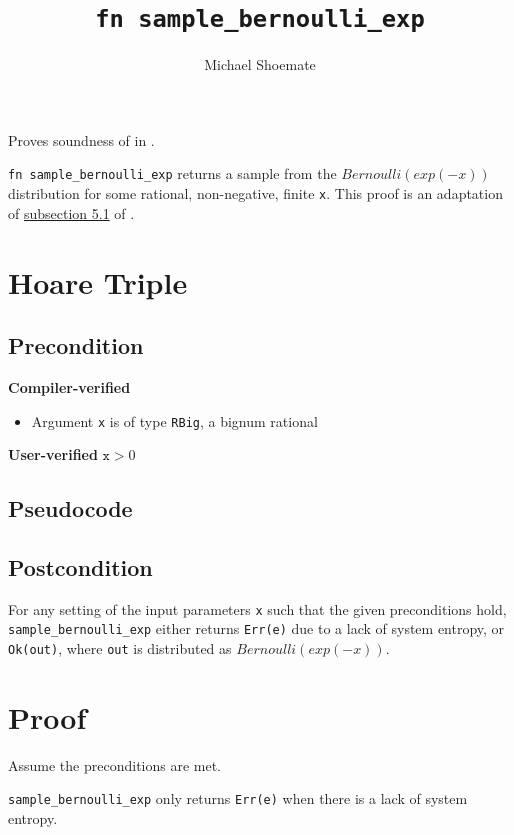 \documentclass{article}
\title{\texttt{fn sample\_bernoulli\_exp}}
\author{Michael Shoemate}
\begin{document}
 
\maketitle 
 
Proves soundness of  in . 
 
\texttt{fn sample\_bernoulli\_exp} returns a sample from the $Bernoulli(exp(-x))$ distribution for some rational, non-negative, finite \texttt{x}. 
This proof is an adaptation of \href{https://arxiv.org/pdf/2004.00010.pdf#subsection.5.1}{subsection 5.1} of \cite{CKS20}. 
 
\section{Hoare Triple} 
\subsection*{Precondition} 
\textbf{Compiler-verified} 
\begin{itemize} 
    \item Argument \texttt{x} is of type \texttt{RBig}, a bignum rational 
\end{itemize} 
 
\textbf{User-verified} 
$\texttt{x} > 0$ 
 
\subsection*{Pseudocode}         
 
 
\subsection*{Postcondition} 
\label{postcondition} 
For any setting of the input parameters \texttt{x} such that the given preconditions hold, \\ 
\texttt{sample\_bernoulli\_exp} either returns \texttt{Err(e)} due to a lack of system entropy, 
or \texttt{Ok(out)}, where \texttt{out} is distributed as $Bernoulli(exp(-x))$. 
 
\section{Proof} 
Assume the preconditions are met. 
 
\begin{lemma} 
    \label{err-e} 
    \texttt{sample\_bernoulli\_exp} only returns \texttt{Err(e)} when there is a lack of system entropy. 
\end{lemma} 
 
\end{document}
